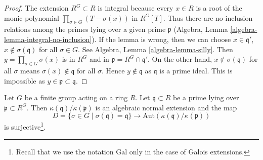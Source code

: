 \begin{proof}
The extension $R^G \subset R$ is integral because every $x \in R$
is a root of the monic polynomial $\prod_{\sigma \in G}(T - \sigma(x))$
in $R^G[T]$. Thus there are no inclusion relations among the primes
lying over a given prime $\mathfrak p$
(Algebra, Lemma \ref{algebra-lemma-integral-no-inclusion}).
If the lemma is wrong, then
we can choose $x \in \mathfrak q'$, $x \not \in \sigma(\mathfrak q)$
for all $\sigma \in G$. See Algebra, Lemma \ref{algebra-lemma-silly}.
Then $y = \prod_{\sigma \in G} \sigma(x)$ is in $R^G$ and
in $\mathfrak p = R^G \cap \mathfrak q'$. On the other hand,
$x \not \in \sigma(\mathfrak q)$ for all $\sigma$ means
$\sigma(x) \not \in \mathfrak q$ for all $\sigma$. Hence
$y \not \in \mathfrak q$ as $\mathfrak q$ is a prime ideal.
This is impossible as $y \in \mathfrak p \subset \mathfrak q$.
\end{proof}

\begin{lemma}
\label{lemma-one-orbit-geometric}
Let $G$ be a finite group acting on a ring $R$. Let $\mathfrak q \subset R$
be a prime lying over $\mathfrak p \subset R^G$. Then
$\kappa(\mathfrak q)/\kappa(\mathfrak p)$ is an algebraic normal
extension and the map
$$
D = \{\sigma \in G \mid \sigma(\mathfrak q) = \mathfrak q\}
\longrightarrow
\text{Aut}(\kappa(\mathfrak q)/\kappa(\mathfrak p))
$$
is surjective\footnote{Recall that we use the notation $\text{Gal}$
only in the case of Galois extensions.}.
\end{lemma}

